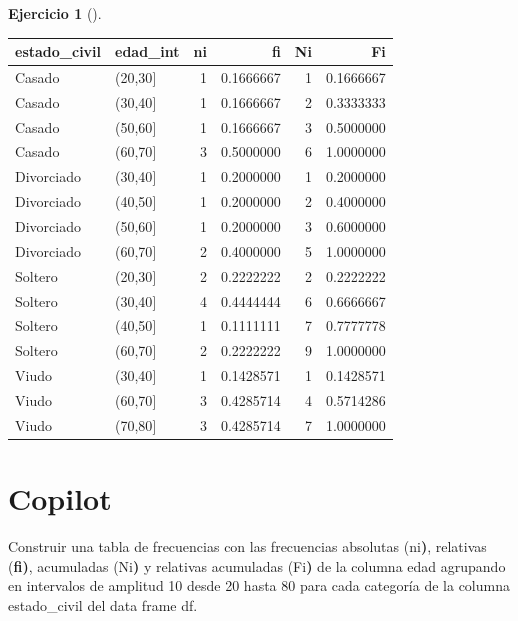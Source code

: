 \documentclass[
  a4paper,
]{scrreport}
\newenvironment{Shaded}{\begin{snugshade}}{\end{snugshade}}
\newcommand{\ControlFlowTok}[1]{\textcolor[rgb]{0.00,0.23,0.31}{\textbf{#1}}}
\newcommand{\ErrorTok}[1]{\textcolor[rgb]{0.68,0.00,0.00}{#1}}
\newcommand{\ExtensionTok}[1]{\textcolor[rgb]{0.00,0.23,0.31}{#1}}
\newcommand{\KeywordTok}[1]{\textcolor[rgb]{0.00,0.23,0.31}{\textbf{#1}}}
\newcommand{\NormalTok}[1]{\textcolor[rgb]{0.00,0.23,0.31}{#1}}
\theoremstyle{definition}
\newtheorem{exercise}{Ejercicio}[chapter]
\theoremstyle{remark}
\begin{document}
\begin{exercise}[]
\begin{enumerate}
\begin{tcolorbox}
  \begin{longtable}[]{@{}llrrrr@{}}
  \toprule\noalign{}
  estado\_civil & edad\_int & ni & fi & Ni & Fi \\
  \midrule\noalign{}
  \endhead
  \bottomrule\noalign{}
  \endlastfoot
  Casado & (20,30{]} & 1 & 0.1666667 & 1 & 0.1666667 \\
  Casado & (30,40{]} & 1 & 0.1666667 & 2 & 0.3333333 \\
  Casado & (50,60{]} & 1 & 0.1666667 & 3 & 0.5000000 \\
  Casado & (60,70{]} & 3 & 0.5000000 & 6 & 1.0000000 \\
  Divorciado & (30,40{]} & 1 & 0.2000000 & 1 & 0.2000000 \\
  Divorciado & (40,50{]} & 1 & 0.2000000 & 2 & 0.4000000 \\
  Divorciado & (50,60{]} & 1 & 0.2000000 & 3 & 0.6000000 \\
  Divorciado & (60,70{]} & 2 & 0.4000000 & 5 & 1.0000000 \\
  Soltero & (20,30{]} & 2 & 0.2222222 & 2 & 0.2222222 \\
  Soltero & (30,40{]} & 4 & 0.4444444 & 6 & 0.6666667 \\
  Soltero & (40,50{]} & 1 & 0.1111111 & 7 & 0.7777778 \\
  Soltero & (60,70{]} & 2 & 0.2222222 & 9 & 1.0000000 \\
  Viudo & (30,40{]} & 1 & 0.1428571 & 1 & 0.1428571 \\
  Viudo & (60,70{]} & 3 & 0.4285714 & 4 & 0.5714286 \\
  Viudo & (70,80{]} & 3 & 0.4285714 & 7 & 1.0000000 \\
  \end{longtable}

  \section{Copilot}

\begin{Shaded}
\begin{Highlighting}[]
\ExtensionTok{Construir}\NormalTok{ una tabla de frecuencias con las frecuencias absolutas }\ErrorTok{(}\ExtensionTok{ni}\KeywordTok{)}\ExtensionTok{,}\NormalTok{ relativas  }\ErrorTok{(}\ControlFlowTok{fi}\KeywordTok{)}\ExtensionTok{,}\NormalTok{ acumuladas }\ErrorTok{(}\ExtensionTok{Ni}\KeywordTok{)} \ExtensionTok{y}\NormalTok{ relativas acumuladas }\ErrorTok{(}\ExtensionTok{Fi}\KeywordTok{)} \ExtensionTok{de}\NormalTok{ la columna edad agrupando en intervalos de amplitud 10 desde 20 hasta 80 para cada categoría de la columna estado\_civil del data frame df.}
\end{Highlighting}
\end{Shaded}


\end{tcolorbox}
\end{enumerate}
\end{exercise}
\end{document}
